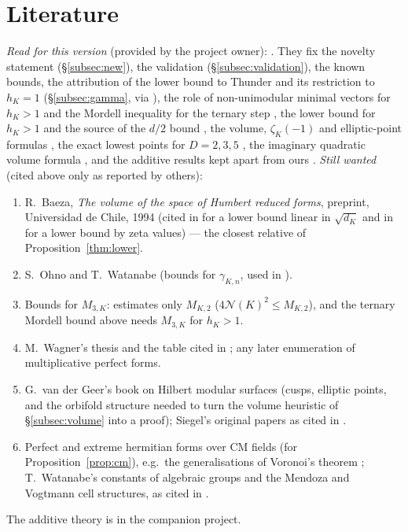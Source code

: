 \documentclass[11pt]{amsart}
\theoremstyle{definition}
\theoremstyle{remark}
\begin{document}
\section{Literature}\label{sec:lit}
\emph{Read for this version} (provided by the project owner):
\cite{PW05,PW09,CIO,Icaza,Thunder,BI97,BI04,CIL,Hirzebruch,Claus,Ong,Ash,GK}.  They fix the novelty statement
(\S\ref{subsec:new}), the validation (\S\ref{subsec:validation}), the known bounds, the
attribution of the lower bound to Thunder and its restriction to $h_K=1$ (\S\ref{subsec:gamma},
via \cite[\S5]{CIL}), the role of non-unimodular minimal vectors for $h_K>1$ and the Mordell
inequality for the ternary step \cite{BI97}, the lower bound for $h_K>1$ and the source of the
$d/2$ bound \cite{BI04}, the volume, $\zeta_K(-1)$ and elliptic-point formulas \cite{Hirzebruch},
the exact lowest points for $D=2,3,5$ \cite{Claus}, the imaginary quadratic volume
formula \cite{GK}, and the additive results kept apart from ours
\cite{Ong,Ash}.
\emph{Still wanted} (cited above only as reported by others):
\begin{enumerate}[leftmargin=*]
\item R.~Baeza, \emph{The volume of the space of Humbert reduced forms}, preprint, Universidad de
Chile, 1994 (cited in \cite{Icaza} for a lower bound linear in $\sqrt{d_K}$ and in \cite{BI97}
for a lower bound by zeta values) --- the closest relative of Proposition~\ref{thm:lower}.
\item S.~Ohno and T.~Watanabe \cite{OW} (bounds for $\gamma_{K,n}$, used in \cite{CIO}).
\item Bounds for $M_{3,K}$: \cite{BI04} estimates only $M_{K,2}$ ($4\mathcal N(K)^2\le M_{K,2}$), and
the ternary Mordell bound above needs $M_{3,K}$ for $h_K>1$.
\item M.~Wagner's thesis and the table cited in \cite{PW09}; any later enumeration of
multiplicative perfect forms.
\item G.~van der Geer's book on Hilbert modular surfaces (cusps, elliptic points, and the
orbifold structure needed to turn the volume heuristic of \S\ref{subsec:volume} into a proof);
Siegel's original papers as cited in \cite{Hirzebruch}.
\item Perfect and extreme hermitian forms over CM fields (for Proposition~\ref{prop:cm}), e.g.\ the
generalisations of Voronoi's theorem \cite{OY}; T.~Watanabe's constants of algebraic groups
and the Mendoza and Vogtmann cell structures, as cited in \cite{CIL}.
\end{enumerate}
The additive theory \cite{Leibak,LeibakThesis,GY} is in the companion project.
\end{document}
